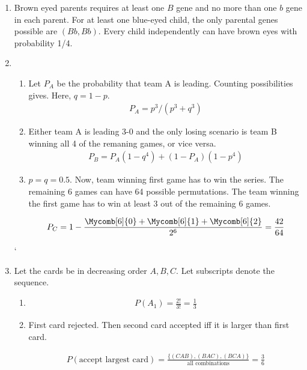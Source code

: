 \begin{enumerate}
	
	\item Brown eyed parents requires at least one $ B $ gene and no more than one $ b $ gene in each parent. For at least one blue-eyed child, the only parental genes possible are $ (Bb, Bb) $.
	Every child independently can have brown eyes with probability 1/4.
	
	\item \begin{enumerate}
		\item Let $ P_A $ be the probability that team A is leading. Counting possibilities gives.
		Here, $ q = 1-p $. 
		\begin{align}
			P_A = p^3 / (p^3 + q^3)
		\end{align}
		
		\item Either team A is leading 3-0 and the only losing scenario is team B winning all 4 of the remaning games, or vice versa. 
		\begin{align}
			P_B = P_A (1 - q^4) + (1 - P_A)(1 - p^4)
		\end{align}
		
		\item $ p = q = 0.5 $. Now, team winning first game has to win the series.
		The remaining 6 games can have 64 possible permutations. The team winning the first game has to win at least 3 out of the remaining 6 games. 
		
		\begin{align}
			P_C = 1 - \frac{\Mycomb[6]{0} + \Mycomb[6]{1} + \Mycomb[6]{2} }{2^6} = \frac{42}{64}
		\end{align}
		
	\end{enumerate}
	
	`	\item Let the cards be in decreasing order $ A, B, C $. Let subscripts denote the sequence.
	\begin{enumerate}
		\item \begin{align}
			P(A_1) = \frac{2!}{3!} = \frac{1}{3}
		\end{align}
		
		\item First card rejected. Then second card accepted iff it is larger than first card.
		
			\begin{align}
				P(\text{accept largest card}) = \frac{\{(CAB), (BAC), (BCA)\}}{\text{all combinations}} = \frac{3}{6}
			\end{align}
		

\end{enumerate}
\end{enumerate}
